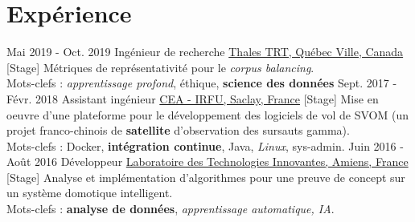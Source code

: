 \documentclass[a4paper]{twentysecondcv} %
\begin{document}

\section{Expérience}

\begin{twenty} %
    \twentyitem
        {Mai 2019 -}
        {Oct. 2019}
        {Ingénieur de recherche}
        {\href{https://www.parctechno.com/fr/registre/?id=97}{Thales TRT, Québec Ville, Canada}}
        {}
        {{[Stage]} Métriques de représentativité pour le \textit{corpus balancing}.\\Mots-clefs : \textit{apprentissage profond}, éthique, \textbf{science des données}}
    \twentyitem
    	{Sept. 2017 -}
                {Févr. 2018}
        {Assistant ingénieur}
        {\href{http://irfu.cea.fr/}{CEA - IRFU, Saclay, France}}
        {}
        {{[Stage]} Mise en oeuvre d'une plateforme pour le développement des logiciels de vol de SVOM (un projet franco-chinois de \textbf{satellite} d'observation des sursauts gamma).\\Mots-clefs : Docker, \textbf{intégration continue}, Java, \textit{Linux}, sys-admin.}
	\twentyitem
    	{Juin 2016 -}
		{Août 2016}
        {Développeur}
        {\href{http://lti-picardie.fr/}{Laboratoire des Technologies Innovantes, Amiens, France}}
        {}
        {{[Stage]} Analyse et implémentation d'algorithmes pour une preuve de concept sur un système domotique intelligent.\\Mots-clefs : \textbf{analyse de données}, \textit{apprentissage automatique, IA}.}
\end{twenty}
\end{document}

